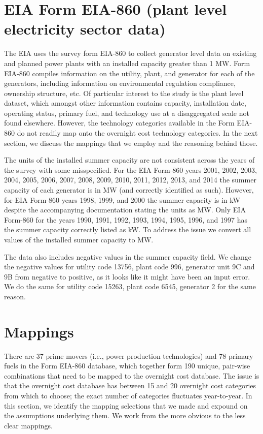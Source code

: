 \documentclass[10pt]{report}
\begin{document}
\section{EIA Form EIA-860 (plant level electricity sector data)}
The EIA uses the survey form EIA-860 to collect generator level data on existing and planned power plants with an installed capacity greater than 1 MW. 
Form EIA-860 compiles information on the utility, plant, and generator for each of the generators, including information on environmental regulation compliance, ownership structure, etc.  
Of particular interest to the study is the plant level dataset, which amongst other information contains capacity, installation date, operating status, primary fuel, and technology use at a disaggregated scale not found elsewhere.
However, the technology categories available in the Form EIA-860 do not readily map onto the overnight cost technology categories. 
In the next section, we discuss the mappings that we employ and the reasoning behind those. 

The units of the installed summer capacity are not consistent across the years of the survey with some misspecified. 
For the EIA Form-860 years 2001, 2002, 2003, 2004, 2005, 2006, 2007, 2008, 2009, 2010, 2011, 2012, 2013, and 2014 the summer capacity of each generator is in MW (and correctly identified as such). 
However, for EIA Form-860 years 1998, 1999, and 2000 the summer capacity is in kW despite the accompanying documentation stating the units as MW. 
Only EIA Form-860 for the years 1990, 1991, 1992, 1993, 1994, 1995, 1996, and 1997 has the summer capacity correctly listed as kW. 
To address the issue we convert all values of the installed summer capacity to MW.

The data also includes negative values in the summer capacity field. 
We change the negative values for utility code 13756, plant code 996, generator unit 9C and 9B from negative to positive, as it looks like it might have been an input error.
We do the same for utility code 15263, plant code 6545, generator 2 for the same reason.

\section{Mappings}
There are 37 prime movers (i.e., power production technologies) and 78 primary fuels in the Form EIA-860 database, which together form 190 unique, pair-wise combinations that need to be mapped to the overnight cost database. 
The issue is that the overnight cost database has between 15 and 20 overnight cost categories from which to choose; the exact number of categories fluctuates year-to-year.
In this section, we identify the mapping selections that we made and expound on the assumptions underlying them.
We work from the more obvious to the less clear mappings.
\end{document}

